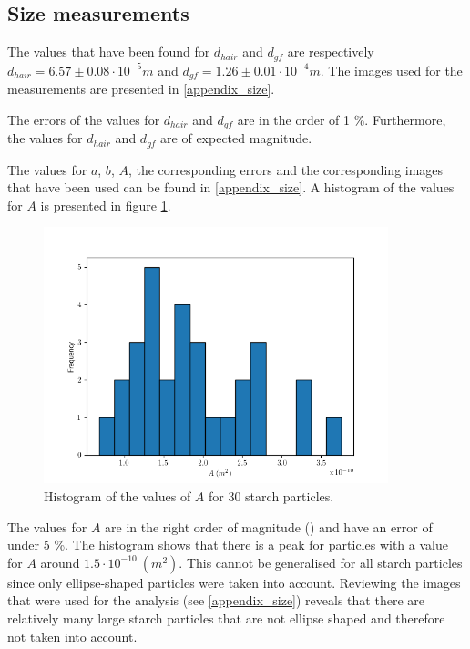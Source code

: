 \subsection{Size measurements}

The values that have been found for $d_{hair}$ and $d_{gf}$ are respectively $d_{hair} = 6.57 \pm 0.08 \cdot 10^{-5} m $ and $d_{gf} =  1.26 \pm 0.01 \cdot 10^{-4} m $. The images used for the measurements are presented in \ref{appendix_size}.

The errors of the values for $d_{hair}$ and $d_{gf}$ are in the order of 1 \%. Furthermore, the values for $d_{hair}$ and $d_{gf}$ are of expected magnitude.

\bigskip

The values for $a$, $b$, $A$, the corresponding errors and the corresponding images that have been used can be found in \ref{appendix_size}. A histogram of the values for $A$ is presented in figure \ref{fig_histogram_zetmeel}.

\begin{figure}[h!]
	\centering
    \includegraphics[width=10cm,keepaspectratio]{afbeeldingen/histogram_zetmeel.png}
    \caption{Histogram of the values of $A$ for 30 starch particles.}
    \label{fig_histogram_zetmeel}
\end{figure}

The values for $A$ are in the right order of magnitude (\cite{starch}) and have an error of under 5 \%.
The histogram shows that there is a peak for particles with a value for $A$ around $1.5 \cdot 10^{-10} \: (m^2)$. This cannot be generalised for all starch particles since only ellipse-shaped particles were taken into account. Reviewing the images that were used for the analysis (see \ref{appendix_size}) reveals that there are relatively many large starch particles that are not ellipse shaped and therefore not taken into account.

